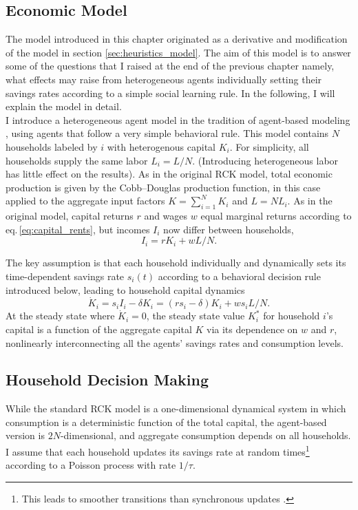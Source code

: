 \subsection{Economic Model}
The model introduced in this chapter originated as a derivative and modification of the model in section \ref{sec:heuristics_model}. The aim of this model is to answer some of the questions that I raised at the end of the previous chapter namely, what effects may raise from heterogeneous agents individually setting their savings rates according to a simple social learning rule. In the following, I will explain the model in detail.\\

I introduce a heterogeneous agent model in the tradition of agent-based modeling \cite{LeBaron1999,Berry2002,Epstein2006,Dosi2010, Dawid2014,Hommes2018,Simon2018},
using agents that follow a very simple behavioral rule.  
This model contains $N$ households labeled by $i$ with heterogenous capital $K_i$. For simplicity, all households supply the same labor $L_i = L/N$.  (Introducing heterogeneous labor has little effect on the results).
As in the original RCK model, total economic production is given by the Cobb--Douglas production function, in this case applied to the aggregate input factors $K = \sum_{i=1}^N K_i$ and $L = N L_i$.
As in the original model, capital returns $r$ and wages $w$ equal marginal returns according to eq.\,\ref{eq:capital_rents},
but incomes $I_i$ now differ between households,
\begin{equation}
\label{eq:Ii}
	I_i = r K_i + w L/N.
\end{equation}

The key assumption is that each household individually and dynamically sets its time-dependent savings rate $s_i(t)$ according to a behavioral decision rule introduced below,
leading to household capital dynamics
\begin{equation}
	\dot{K}_i = s_i I_i - \delta K_i = (r s_i - \delta) K_i + w s_i L/N.
        \label{eq:rcka_kdot}
\end{equation}
At the steady state where $\dot{K}_i = 0$, the steady state value $K_i^*$ for household $i$'s capital is a function of the aggregate capital $K$ via its dependence on $w$ and $r$, 
nonlinearly interconnecting all the agents' savings rates and consumption levels.

\subsection{Household Decision Making}
While the standard RCK model is a one-dimensional dynamical system in which consumption is a deterministic function of the total capital, the agent-based version is $2N$-dimensional, and aggregate consumption depends on all households.
I assume that each household updates its savings rate at random times\footnote{
%
This leads to smoother transitions than synchronous updates \citep{Vizzari2005, Fates2010}.
}
%
according to a Poisson process with rate $1/\tau$.

